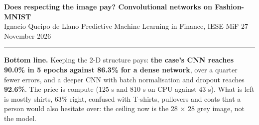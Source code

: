 \documentclass[10pt,a4paper]{article}
\begin{document}
\small

{\large\textbf{Does respecting the image pay? Convolutional networks on Fashion-MNIST}}\\
Ignacio Queipo de Llano \textperiodcentered{} Predictive Machine Learning in Finance, IESE MiF \textperiodcentered{} 27 November 2026\\[-6pt]
\rule{\linewidth}{0.4pt}

\begin{tcolorbox}[colback=white,colframe=black,boxrule=0.4pt,sharp corners,left=5pt,right=5pt,top=3pt,bottom=3pt]
\textbf{Bottom line.} Keeping the 2-D structure pays: \textbf{the case's CNN reaches 90.0\% in 5 epochs against
86.3\% for a dense network}, over a quarter fewer errors, and a deeper CNN with batch normalisation and dropout
reaches \textbf{92.6\%}. The price is compute (125 s and 810 s on CPU against 43 s). What is left is mostly shirts,
63\% right, confused with T-shirts, pullovers and coats that a person would also hesitate over: the ceiling now is
the 28 $\times$ 28 grey image, not the model.
\end{tcolorbox}
\end{document}
